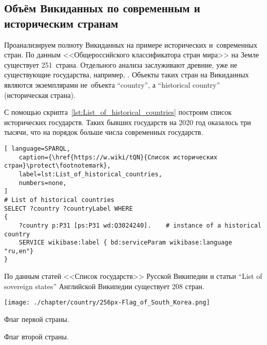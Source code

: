 \subsection{Объём Викиданных по современным и историческим странам}

Проанализируем полноту Викиданных на примере исторических и~современных стран. 
По данным <<Общероссийского классификатора стран мира>>\autocite{oksm} на Земле существует 251~страна.
Отдельного анализа заслуживают древние, уже не существующие государства, например, . 
Объекты таких стран на Викиданных являются экземплярами не~объекта ``country'', 
а  ``historical country'' (историческая страна). 

С помощью скрипта~\ref{lst:List_of_historical_countries} построим список исторических государств. 
Таких бывших государств на 2020 год оказалось три тысячи, что на порядок больше числа современных государств.
%


\begin{lstlisting}[ language=SPARQL, 
    caption={\href{https://w.wiki/tQN}{Список исторических стран}\protect\footnotemark},
    label=lst:List_of_historical_countries, 
    numbers=none,
]
# List of historical countries
SELECT ?country ?countryLabel WHERE
{
    ?country p:P31 [ps:P31 wd:Q3024240].    # instance of a historical country 
    SERVICE wikibase:label { bd:serviceParam wikibase:language "ru,en"} 
}
\end{lstlisting}


По данным статей <<Список государств>>\autocite{list_of_sovereign_states} Русской Википедии 
и статьи ``List of sovereign states''\autocite{list_of_sovereign_states_en} Английской Википедии существует 208 стран.

\begin{marginfigure}[0.0cm]
    \centering
        \texttt{[image: ./chapter/country/256px-Flag\_of\_South\_Korea.png]}
	\caption{Флаг первой страны.}%
	\label{fig:flag_kor}%
\end{marginfigure}
\begin{marginfigure}[0.0cm]
    \centering
	    \setlength{\fboxsep}{0pt}%
	    \setlength{\fboxrule}{1pt}%
	\caption{Флаг второй страны.}%
	\label{fig:flag_singapore}%
\end{marginfigure}



